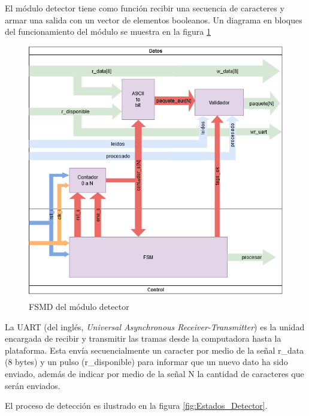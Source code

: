 		El módulo detector tiene como función recibir una secuencia de caracteres y armar una salida con un vector de elementos booleanos. Un diagrama en bloques del funcionamiento del módulo se muestra en la figura \ref{fig:FSMD_Detector}
		
		\begin{figure}[h]
		\centering
			\includegraphics[scale=.6]{./Figures/FSMD-Detector}
			\caption{FSMD del módulo detector}
			\label{fig:FSMD_Detector}
		\end{figure}
		
		\vspace{10cm}
		
		La UART (del inglés, \textit{Universal Asynchronous Receiver-Transmitter}) es la unidad encargada de recibir y transmitir las tramas desde la computadora hasta la plataforma. Esta envía secuencialmente un caracter por medio de la señal r\_data (8 bytes) y un pulso (r\_disponible) para informar que un nuevo dato ha sido enviado, además de indicar por medio de la señal N la cantidad de caracteres que serán enviados. 
		
		El proceso de detección es ilustrado en la figura \ref{fig:Estados_Detector}.  		
		
